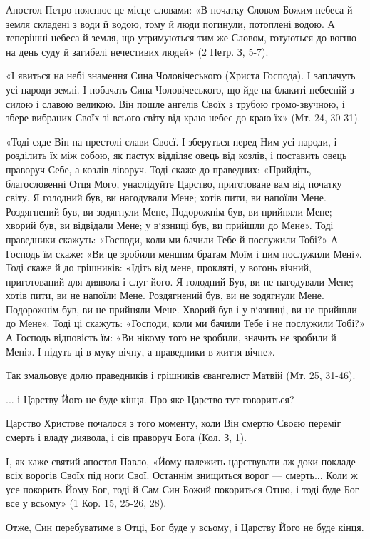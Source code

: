 \documentclass[main.tex]{subfiles}
\begin{document}
Апостол Петро пояснює це місце словами: «В початку Словом Божим небеса й земля складені з води й водою, тому й люди погинули, потоплені водою. А теперішні небеса й земля, що утримуються тим же Словом, готуються до вогню на день суду й загибелі нечестивих людей» (2 Петр. З, 5-7).

«І явиться на небі знамення Сина Чоловічеського (Христа Господа). І заплачуть усі народи землі. І побачать Сина Чоловічеського, що йде на блакиті небесній з силою і славою великою. Він пошле ангелів Своїх з трубою громо-звучною, і збере вибраних Своїх зі всього світу від краю небес до краю їх» (Мт. 24, 30-31).

«Тоді сяде Він на престолі слави Своєї. І зберуться перед Ним усі народи, і розділить їх між собою, як пастух відділяє овець від козлів, і поставить овець праворуч Себе, а козлів ліворуч. Тоді скаже до праведних: «Прийдіть, благословенні Отця Мого, унаслідуйте Царство, приготоване вам від початку світу. Я голодний був, ви нагодували Мене; хотів пити, ви напоїли Мене. Роздягнений був, ви зодягнули Мене, Подорожнім був, ви прийняли Мене; хворий був, ви відвідали Мене; у в`язниці був, ви прийшли до Мене». Тоді праведники скажуть: «Господи, коли ми бачили Тебе й послужили Тобі?» А Господь їм скаже: «Ви це зробили меншим братам Моїм і цим послужили Мені». Тоді скаже й до грішників: «Ідіть від мене, прокляті, у вогонь вічний, приготований для диявола і слуг його. Я голодний Був, ви не нагодували Мене; хотів пити, ви не напоїли Мене. Роздягнений був, ви не зодягнули Мене. Подорожнім був, ви не прийняли Мене. Хворий був і у в`язниці, ви не прийшли до Мене». Тоді ці скажуть: «Господи, коли ми бачили Тебе і не послужили Тобі?» А Господь відповість їм: «Ви нікому того не зробили, значить не зробили й Мені». І підуть ці в муку вічну, а праведники в життя вічне».

Так змальовує долю праведників і грішників євангелист Матвій (Мт. 25, 31-46).

... і Царству Його не буде кінця. Про яке Царство тут говориться?

Царство Христове почалося з того моменту, коли Він смертю Своєю переміг смерть і владу диявола, і сів праворуч Бога (Кол. З, 1).

І, як каже святий апостол Павло, «Йому належить царствувати аж доки покладе всіх ворогів Своїх під ноги Свої. Останнім знищиться ворог — смерть... Коли ж усе покорить Йому Бог, тоді й Сам Син Божий покориться Отцю, і тоді буде Бог все у всьому» (1 Кор. 15, 25-26, 28).

Отже, Син перебуватиме в Отці, Бог буде у всьому, і Царству Його не буде кінця.
\end{document}
